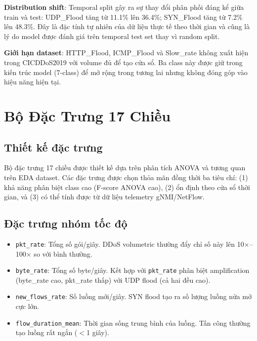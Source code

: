 \documentclass[12pt,a4paper]{article}
\begin{document}
\textbf{Distribution shift}: Temporal split gây ra sự thay đổi phân phối đáng kể giữa train và test: UDP\_Flood tăng từ 11.1\% lên 36.4\%; SYN\_Flood tăng từ 7.2\% lên 48.3\%. Đây là đặc tính tự nhiên của dữ liệu thực tế theo thời gian và cũng là lý do model được đánh giá trên temporal test set thay vì random split.

\textbf{Giới hạn dataset}: HTTP\_Flood, ICMP\_Flood và Slow\_rate không xuất hiện trong CICDDoS2019 với volume đủ để tạo cửa sổ. Ba class này được giữ trong kiến trúc model (7-class) để mở rộng trong tương lai nhưng không đóng góp vào hiệu năng hiện tại.

\section{Bộ Đặc Trưng 17 Chiều}
\label{sec:features}

\subsection{Thiết kế đặc trưng}

Bộ đặc trưng 17 chiều được thiết kế dựa trên phân tích ANOVA và tương quan trên EDA dataset. Các đặc trưng được chọn thỏa mãn đồng thời ba tiêu chí: (1) khả năng phân biệt class cao (F-score ANOVA cao), (2) ổn định theo cửa sổ thời gian, và (3) có thể tính được từ dữ liệu telemetry gNMI/NetFlow.

\subsection{Đặc trưng nhóm tốc độ}

\begin{itemize}[leftmargin=2em]
\item \texttt{pkt\_rate}: Tổng số gói/giây. DDoS volumetric thường đẩy chỉ số này lên 10$\times$--100$\times$ so với bình thường.
\item \texttt{byte\_rate}: Tổng số byte/giây. Kết hợp với \texttt{pkt\_rate} phân biệt amplification (byte\_rate cao, pkt\_rate thấp) với UDP flood (cả hai đều cao).
\item \texttt{new\_flows\_rate}: Số luồng mới/giây. SYN flood tạo ra số lượng luồng nửa mở cực lớn.
\item \texttt{flow\_duration\_mean}: Thời gian sống trung bình của luồng. Tấn công thường tạo luồng rất ngắn ($<$1 giây).
\end{itemize}
\end{document}
